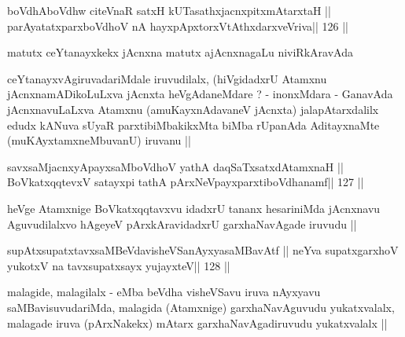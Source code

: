 \begin{shl}
boVdhAboVdhw citeVnaR satxH kUTasathxjacnxpitxmAtarxtaH ||
parAyatatxparxboVdhoV nA hayxpApxtorxVtAthxdarxveVriva\hfill || 126 ||
\end{shl}

\begin{artha}
matutx ceYtanayxkekx jAcnxna matutx ajAcnxnagaLu niviRkAravAda 
\end{artha} 

\begin{artha}
ceYtanayxvAgiruvadariMdale iruvudilalx, (hiVgidadxrU Atamxnu jAcnxnamADikoLuLxva jAcnxta heVgAdaneMdare ? - inonxMdara - GanavAda jAcnxnavuLaLxva Atamxnu (amuKayxnAdavaneV jAcnxta) jalapAtarxdalilx edudx kANuva sUyaR parxtibiMbakikxMta biMba rUpanAda AditayxnaMte (muKAyxtamxneMbuvanU) iruvanu ||
\end{artha}

\begin{shl}
savxsaMjacnxyA\s payxsaMboVdhoV yathA daqSaTxsatxdAtamxnaH ||
BoVkatxqqtevxV satayxpi tathA pArxNeV\s payxparxtiboVdhanamf\hfill || 127 ||
\end{shl}

\begin{artha}
heVge Atamxnige BoVkatxqqtavxvu idadxrU tananx hesariniMda jAcnxnavu Aguvudilalxvo hAgeyeV pArxkAravidadxrU garxhaNavAgade iruvudu ||
\end{artha} 

\begin{shl}
supAtxsupatxtavxsaMBeVdavisheVSanAyxyasaMBavAtf ||
neYva supatxgarxhoV yukotxV na tavxsupatxsayx yujayxteV\hfill || 128 ||
\end{shl}

\begin{artha}
malagide, malagilalx - eMba beVdha visheVSavu iruva nAyxyavu saMBavisuvudariMda, malagida (Atamxnige) garxhaNavAguvudu yukatxvalalx, malagade iruva (pArxNakekx) mAtarx garxhaNavAgadiruvudu yukatxvalalx ||
\end{artha}

